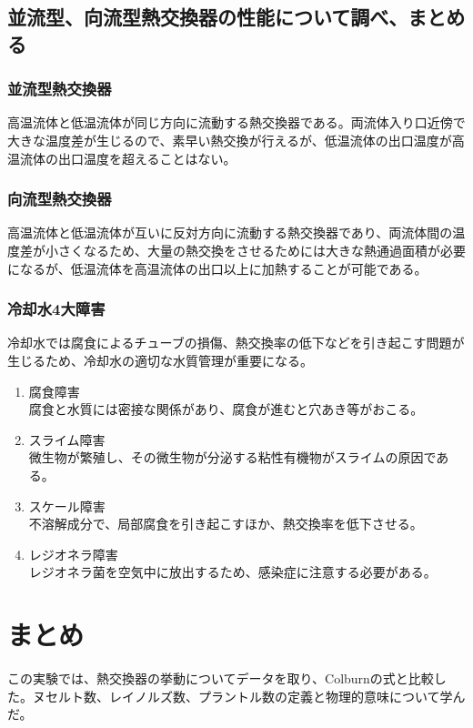 \documentclass[a4j,twoside,openright,11pt]{jarticle}
\begin{document}
\subsection{並流型、向流型熱交換器の性能について調べ、まとめる}
\subsubsection{並流型熱交換器}
高温流体と低温流体が同じ方向に流動する熱交換器である。両流体入り口近傍で大きな温度差が生じるので、素早い熱交換が行えるが、低温流体の出口温度が高温流体の出口温度を超えることはない。

\subsubsection{向流型熱交換器}
高温流体と低温流体が互いに反対方向に流動する熱交換器であり、両流体間の温度差が小さくなるため、大量の熱交換をさせるためには大きな熱通過面積が必要になるが、低温流体を高温流体の出口以上に加熱することが可能である。\\
\par

\subsubsection{冷却水4大障害}
冷却水では腐食によるチューブの損傷、熱交換率の低下などを引き起こす問題が生じるため、冷却水の適切な水質管理が重要になる。
\begin{enumerate}
\item 腐食障害\\
腐食と水質には密接な関係があり、腐食が進むと穴あき等がおこる。
\item スライム障害\\
微生物が繁殖し、その微生物が分泌する粘性有機物がスライムの原因である。
\item スケール障害\\
不溶解成分で、局部腐食を引き起こすほか、熱交換率を低下させる。
\item レジオネラ障害\\
レジオネラ菌を空気中に放出するため、感染症に注意する必要がある。
\end{enumerate}

\section{まとめ}
この実験では、熱交換器の挙動についてデータを取り、Colburnの式と比較した。ヌセルト数、レイノルズ数、プラントル数の定義と物理的意味について学んだ。
\end{document}
